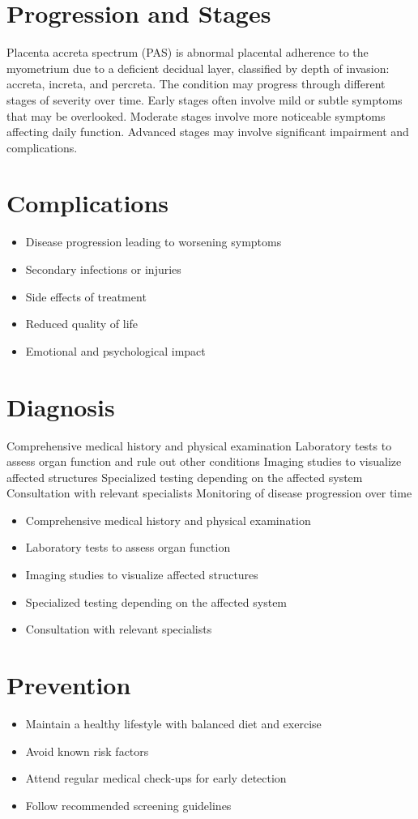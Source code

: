 \section{Progression and Stages}
Placenta accreta spectrum (PAS) is abnormal placental adherence to the myometrium due to a deficient decidual layer, classified by depth of invasion: accreta, increta, and percreta. The condition may progress through different stages of severity over time. Early stages often involve mild or subtle symptoms that may be overlooked. Moderate stages involve more noticeable symptoms affecting daily function. Advanced stages may involve significant impairment and complications.
\section{Complications}
\begin{itemize}[noitemsep]
  \item Disease progression leading to worsening symptoms
  \item Secondary infections or injuries
  \item Side effects of treatment
  \item Reduced quality of life
  \item Emotional and psychological impact
\end{itemize}
\section{Diagnosis}
Comprehensive medical history and physical examination Laboratory tests to assess organ function and rule out other conditions Imaging studies to visualize affected structures Specialized testing depending on the affected system Consultation with relevant specialists Monitoring of disease progression over time

\begin{itemize}[noitemsep]
  \item Comprehensive medical history and physical examination
  \item Laboratory tests to assess organ function
  \item Imaging studies to visualize affected structures
  \item Specialized testing depending on the affected system
  \item Consultation with relevant specialists
\end{itemize}
\section{Prevention}
\begin{itemize}[noitemsep]
  \item Maintain a healthy lifestyle with balanced diet and exercise
  \item Avoid known risk factors
  \item Attend regular medical check-ups for early detection
  \item Follow recommended screening guidelines
\end{itemize}
